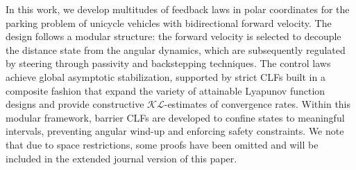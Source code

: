 \documentclass[letterpaper, 10 pt, conference]{ieeeconf}  %
\begin{document}
In this work, we develop multitudes of feedback laws in polar coordinates for the parking problem of unicycle vehicles with bidirectional forward velocity. The design follows a modular structure: the forward velocity is selected to decouple the distance state from the angular dynamics, which are subsequently regulated by steering through passivity and backstepping techniques. The control laws achieve global asymptotic stabilization, supported by strict CLFs built in a composite fashion that expand the variety of attainable Lyapunov function designs and provide constructive $\mathcal{KL}$-estimates of convergence rates. Within this modular framework, barrier CLFs are developed to confine states to meaningful intervals, preventing angular wind-up and enforcing safety constraints. 
 We note that due to space restrictions, some proofs have been omitted and will be included in the extended journal version of this paper.

\raggedbottom
\end{document}
